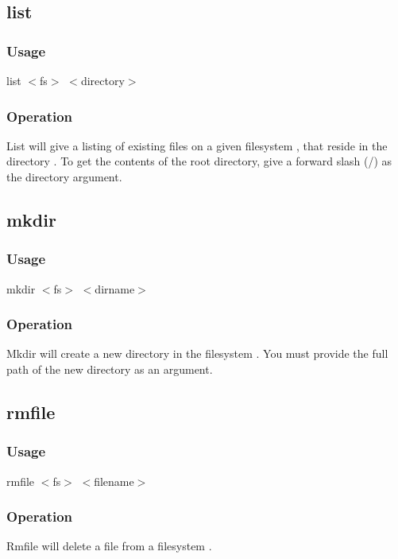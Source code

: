 \subsection{list}
    \subsubsection*{Usage}
	list $<$fs$>$ $<$directory$>$
    \subsubsection*{Operation}
	List will give a listing of existing files on a given filesystem , that
	reside in the directory . To get the contents of the root directory,
	give a forward slash (/) as the directory argument.
    
\subsection{mkdir}
    \subsubsection*{Usage}
	mkdir $<$fs$>$ $<$dirname$>$
    \subsubsection*{Operation}
	Mkdir will create a new directory in the filesystem . You must provide the full path
	of the new directory as an argument.
    
\subsection{rmfile}
    \subsubsection*{Usage}
	rmfile $<$fs$>$ $<$filename$>$
    \subsubsection*{Operation}
	Rmfile will delete a file from a filesystem .
    
